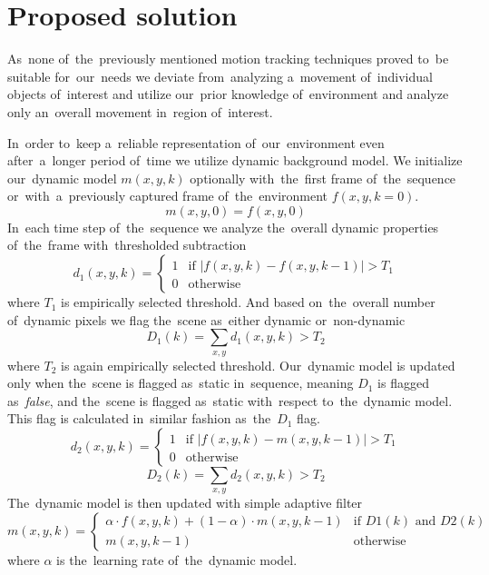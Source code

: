 \chapter{Proposed solution}
As~none of~the~previously mentioned motion tracking techniques proved to~be suitable for~our~needs we deviate from~analyzing a~movement of~individual objects of~interest and utilize our~prior knowledge of~environment and analyze only an~overall movement in~region of~interest.

In~order to~keep a~reliable representation of~our~environment even after~a~longer period of~time we utilize dynamic background model. We initialize our~dynamic model $m(x,y,k)$ optionally with~the~first frame of~the~sequence or~with~a~previously captured frame of~the~environment $f(x,y,k=0)$.
\begin{equation}
    m(x,y,0) = f(x,y,0)
\end{equation}
In~each time step of~the~sequence we analyze the~overall dynamic properties of~the~frame with~thresholded subtraction
\begin{equation}
    d_1(x,y,k) = 
    \begin{cases}
        1  & \text{if } \left\lvert f(x,y,k) - f(x,y,k-1) \right\rvert > T_1 \\
        0  & \text{otherwise}
    \end{cases}
\end{equation}
where $T_1$ is empirically selected threshold. And based on~the~overall number of~dynamic pixels we flag the~scene as~either dynamic or~non-dynamic
\begin{equation}
    D_1(k) = \sum _{x,y}d_1(x, y, k) > T_2
\end{equation}
where $T_2$ is again empirically selected threshold. Our~dynamic model is updated only when the~scene is flagged as~static in~sequence, meaning $D_1$ is flagged as~\textit{false}, and the~scene is flagged as~static with~respect to~the~dynamic model. This flag is calculated in~similar fashion as~the~$D_1$ flag.
\begin{equation}
    d_2(x,y,k) = 
    \begin{cases}
        1  & \text{if } \left\lvert f(x,y,k) - m(x,y,k-1) \right\rvert > T_1 \\
        0  & \text{otherwise}
    \end{cases}
\end{equation}
\begin{equation}
    D_2(k) = \sum _{x,y}d_2(x, y, k) > T_2
\end{equation}
The~dynamic model is then updated with simple adaptive filter
\begin{equation}
    m(x, y, k) = 
    \begin{cases}
        \alpha \cdot f(x,y,k) + (1-\alpha)\cdot m(x, y, k-1)  & \text{if } D1(k) \text{ and } D2(k) \\
        m(x, y, k-1)  & \text{otherwise}
    \end{cases}
\end{equation}
where $\alpha$ is the~learning rate of~the~dynamic model.

